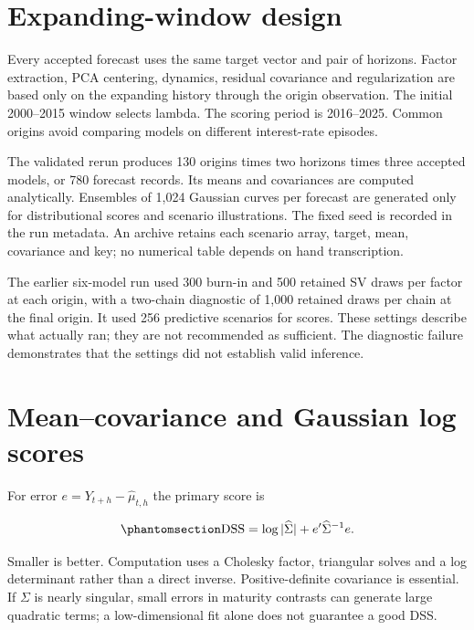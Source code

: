 \documentclass[
  12pt,
  letterpaper,
  DIV=11,
  numbers=noendperiod]{scrreprt}
\begin{document}
\section{Expanding-window design}\label{expanding-window-design}

Every accepted forecast uses the same target vector and pair of
horizons. Factor extraction, PCA centering, dynamics, residual
covariance and regularization are based only on the expanding history
through the origin observation. The initial 2000--2015 window selects
lambda. The scoring period is 2016--2025. Common origins avoid comparing
models on different interest-rate episodes.

The validated rerun produces 130 origins times two horizons times three
accepted models, or 780 forecast records. Its means and covariances are
computed analytically. Ensembles of 1,024 Gaussian curves per forecast
are generated only for distributional scores and scenario illustrations.
The fixed seed is recorded in the run metadata. An archive retains each
scenario array, target, mean, covariance and key; no numerical table
depends on hand transcription.

The earlier six-model run used 300 burn-in and 500 retained SV draws per
factor at each origin, with a two-chain diagnostic of 1,000 retained
draws per chain at the final origin. It used 256 predictive scenarios
for scores. These settings describe what actually ran; they are not
recommended as sufficient. The diagnostic failure demonstrates that the
settings did not establish valid inference.

\section{Mean--covariance and Gaussian log
scores}\label{meancovariance-and-gaussian-log-scores}

For error \(e=Y_{t+h}-\widehat\mu_{t,h}\) the primary score is

\begin{equation}\protect\phantomsection\label{eq-dss}{
\operatorname{DSS}=\log|\widehat\Sigma|+e'\widehat\Sigma^{-1}e.
}\end{equation}

Smaller is better. Computation uses a Cholesky factor, triangular solves
and a log determinant rather than a direct inverse. Positive-definite
covariance is essential. If \(\Sigma\) is nearly singular, small errors
in maturity contrasts can generate large quadratic terms; a
low-dimensional fit alone does not guarantee a good DSS.
\end{document}
